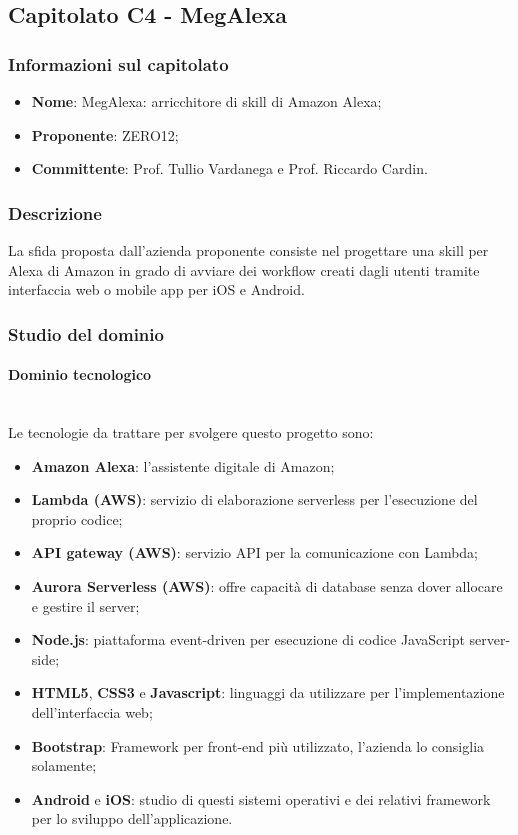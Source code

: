 \subsection{Capitolato C4 - MegAlexa}
\subsubsection{Informazioni sul capitolato}
\begin{itemize}
    \item \textbf{Nome}: MegAlexa: arricchitore di skill di Amazon Alexa;
	\item \textbf{Proponente}: ZERO12; 
	\item \textbf{Committente}: Prof. Tullio Vardanega e Prof. Riccardo Cardin.
\end{itemize}
\subsubsection{Descrizione}
La sfida proposta dall'azienda proponente consiste nel progettare una skill per 
Alexa di Amazon
in grado di avviare dei workflow creati dagli utenti tramite interfaccia web o
mobile app per iOS e Android.

\subsubsection{Studio del dominio}
\paragraph{Dominio tecnologico} \mbox{}\\
Le tecnologie da trattare per svolgere questo progetto sono:
\begin{itemize}
    \item \textbf{Amazon Alexa}: l'assistente digitale di Amazon;
    \item \textbf{Lambda (AWS)}: servizio di elaborazione serverless per 
l'esecuzione del proprio codice;
    \item \textbf{API gateway (AWS)}: servizio API per la comunicazione con 
Lambda;
    \item \textbf{Aurora Serverless (AWS)}: offre capacità di database senza 
dover allocare e gestire il server;
    \item \textbf{Node.js}: piattaforma event-driven per esecuzione di codice 
JavaScript server-side;
    \item \textbf{HTML5}, \textbf{CSS3} e \textbf{Javascript}: linguaggi da 
utilizzare per l'implementazione
    dell'interfaccia web;
    \item \textbf{Bootstrap}: Framework per front-end più utilizzato, l'azienda 
lo consiglia solamente;
	\item \textbf{Android} e \textbf{iOS}: studio di questi sistemi operativi e 
	dei relativi framework per lo sviluppo dell'applicazione. 

\end{itemize}
